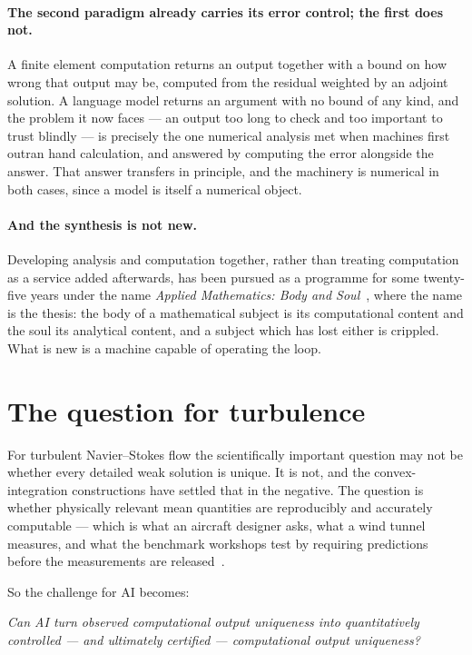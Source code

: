 \documentclass[11pt]{article}
\begin{document}
\paragraph{The second paradigm already carries its error control; the first does not.} A finite
element computation returns an output together with a bound on how wrong that output may be, computed
from the residual weighted by an adjoint solution. A language model returns an argument with no
bound of any kind, and the problem it now faces --- an output too long to check and too important to
trust blindly --- is precisely the one numerical analysis met when machines first outran hand
calculation, and answered by computing the error alongside the answer. That answer transfers in
principle, and the machinery is numerical in both cases, since a model is itself a numerical object.

\paragraph{And the synthesis is not new.} Developing analysis and computation together, rather than
treating computation as a service added afterwards, has been pursued as a programme for some
twenty-five years under the name \emph{Applied Mathematics: Body and Soul}~\cite{bodysoul,bsbooks},
where the name is the thesis: the body of a mathematical subject is its computational content and the
soul its analytical content, and a subject which has lost either is crippled. What is new is a
machine capable of operating the loop.

\section{The question for turbulence}\label{sec:question}

For turbulent Navier--Stokes flow the scientifically important question may not be whether every
detailed weak solution is unique. It is not, and the convex-integration constructions have settled
that in the negative. The question is whether physically relevant mean quantities are reproducibly
and accurately computable --- which is what an aircraft designer asks, what a wind tunnel measures,
and what the benchmark workshops test by requiring predictions before the measurements are
released~\cite{cs1,ifasd}.

So the challenge for AI becomes:

\begin{center}
\emph{Can AI turn observed computational output uniqueness into quantitatively controlled --- and
ultimately certified --- computational output uniqueness?}
\end{center}
\end{document}
